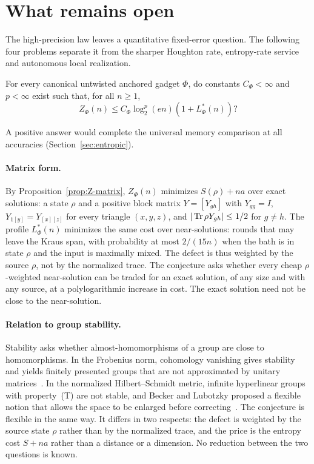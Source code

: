 \section{What remains open}\label{sec:open}

The high-precision law leaves a quantitative fixed-error question.
The following four problems separate it from the sharper Houghton
rate, entropy-rate service and autonomous local realization.

\begin{problem}\label{prob:keep-bias}
For every canonical untwisted anchored gadget $\Phi$, do constants
$C_\Phi<\infty$ and $p<\infty$ exist such that, for all $n\geq1$,
\[
 Z_\Phi(n)\leq C_\Phi\log_2^p(en)(1+L^*_\Phi(n))?
\]
\end{problem}

A positive answer would complete the universal memory comparison at
all accuracies (Section~\ref{sec:entropic}).

\paragraph{Matrix form.}
By Proposition~\ref{prop:Z-matrix}, $Z_\Phi(n)$ minimizes
$S(\rho)+na$ over exact solutions: a state $\rho$ and a positive block
matrix $Y=[Y_{gh}]$ with $Y_{gg}=I$, $Y_{1[y]}=Y_{[x][z]}$ for every
triangle $(x,y,z)$, and $|\operatorname{Tr}\rho Y_{gh}|\leq1/2$ for $g\ne h$.
The profile $L^*_\Phi(n)$ minimizes the same cost over near-solutions:
rounds that may leave the Kraus span, with probability at most
$2/(15n)$ when the bath is in state $\rho$ and the input is maximally
mixed. The defect is thus weighted by the source $\rho$, not by the
normalized trace. The conjecture asks whether every cheap
$\rho$-weighted near-solution can be traded for an exact solution, of
any size and with any source, at a polylogarithmic increase in cost.
The exact solution need not be close to the near-solution.

\paragraph{Relation to group stability.}
Stability asks whether almost-homomorphisms of a group are close to
homomorphisms. In the Frobenius norm, cohomology vanishing gives
stability and yields finitely presented groups that are not
approximated by unitary matrices~\cite{DeChiffreEtAl2020}. In the
normalized Hilbert--Schmidt metric, infinite hyperlinear groups with
property~(T) are not stable, and Becker and Lubotzky proposed a
flexible notion that allows the space to be enlarged before
correcting~\cite[Section~4.4]{BeckerLubotzky2020}. The conjecture is
flexible in the same way. It differs in two respects: the defect is
weighted by the source state $\rho$ rather than by the normalized
trace, and the price is the entropy cost $S+na$ rather than a distance
or a dimension. No reduction between the two questions is known.

